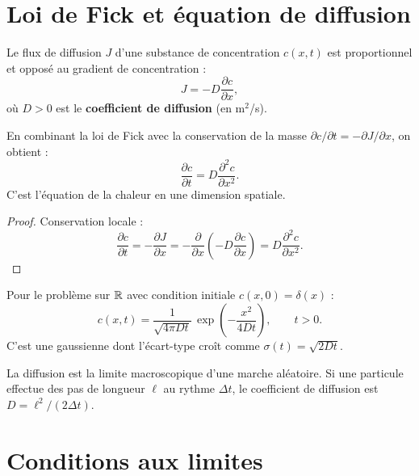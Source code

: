 \section{Loi de Fick et \'equation de diffusion}
\label{sec:fick}

\begin{definition}
Le flux de diffusion $J$ d'une substance de concentration $c(x,t)$
est proportionnel et oppos\'e au gradient de concentration :
\[
  J = -D\frac{\partial c}{\partial x},
\]
o\`u $D>0$ est le \textbf{coefficient de diffusion} (en m$^2$/s).
\end{definition}

\begin{theoreme}
En combinant la loi de Fick avec la conservation de la masse
$\partial c/\partial t = -\partial J/\partial x$, on obtient :
\[
  \frac{\partial c}{\partial t} = D\frac{\partial^2 c}{\partial x^2}.
\]
C'est l'\'equation de la chaleur en une dimension spatiale.
\end{theoreme}

\begin{proof}
Conservation locale :
\[
  \frac{\partial c}{\partial t} = -\frac{\partial J}{\partial x}
  = -\frac{\partial}{\partial x}\left(-D\frac{\partial c}{\partial x}\right)
  = D\frac{\partial^2 c}{\partial x^2}.
\]
\end{proof}

\begin{formules}[title=\textbf{Solution fondamentale (noyau de la chaleur)}]
Pour le probl\`eme sur $\mathbb{R}$ avec condition initiale $c(x,0)=\delta(x)$ :
\[
  c(x,t) = \frac{1}{\sqrt{4\pi Dt}}\,\exp\!\left(-\frac{x^2}{4Dt}\right),
  \qquad t>0.
\]
C'est une gaussienne dont l'\'ecart-type cro\^it comme $\sigma(t)=\sqrt{2Dt}$.
\end{formules}

\begin{intuition}[title=\textbf{Diffusion et marche al\'eatoire}]
La diffusion est la limite macroscopique d'une marche al\'eatoire.
Si une particule effectue des pas de longueur $\ell$ au rythme $\Delta t$,
le coefficient de diffusion est $D=\ell^2/(2\Delta t)$.
\end{intuition}

\section{Conditions aux limites}

